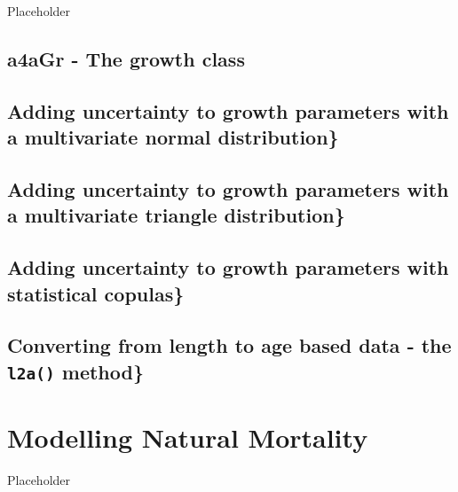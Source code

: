 \documentclass[
]{book}
\begin{document}
Placeholder

\hypertarget{a4agr---the-growth-class}{%
\section{a4aGr - The growth class}\label{a4agr---the-growth-class}}

\hypertarget{adding-uncertainty-to-growth-parameters-with-a-multivariate-normal-distribution}{%
\section{Adding uncertainty to growth parameters with a multivariate normal distribution\}}\label{adding-uncertainty-to-growth-parameters-with-a-multivariate-normal-distribution}}

\hypertarget{adding-uncertainty-to-growth-parameters-with-a-multivariate-triangle-distribution}{%
\section{Adding uncertainty to growth parameters with a multivariate triangle distribution\}}\label{adding-uncertainty-to-growth-parameters-with-a-multivariate-triangle-distribution}}

\hypertarget{adding-uncertainty-to-growth-parameters-with-statistical-copulas}{%
\section{Adding uncertainty to growth parameters with statistical copulas\}}\label{adding-uncertainty-to-growth-parameters-with-statistical-copulas}}

\hypertarget{converting-from-length-to-age-based-data---the-l2a-method}{%
\section{\texorpdfstring{Converting from length to age based data - the \texttt{l2a()} method\}}{Converting from length to age based data - the l2a() method\}}}\label{converting-from-length-to-age-based-data---the-l2a-method}}

\hypertarget{modelling-natural-mortality}{%
\chapter{Modelling Natural Mortality}\label{modelling-natural-mortality}}

Placeholder
\end{document}
